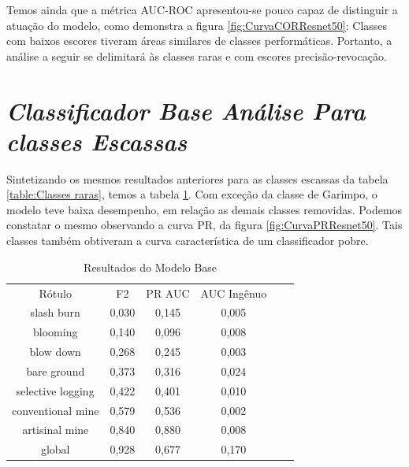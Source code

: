 Temos ainda que a métrica AUC-ROC apresentou-se pouco capaz de distinguir a atuação do modelo, como demonstra a figura \ref{fig:CurvaCORResnet50}: Classes com baixos escores tiveram áreas similares de classes performáticas. Portanto, a análise a seguir se delimitará às classes raras e com escores precisão-revocação.

\section{\textit{Classificador Base Análise Para classes Escassas}}\label{sec:Cap4_ClassifiadorBase}

Sintetizando os mesmos resultados anteriores para as classes escassas da tabela \ref{table:Classes raras}, temos a tabela \ref{table:ResultadosResnet50ClassesRaras}. Com exceção da classe de Garimpo, o modelo teve baixa desempenho, em relação as demais classes removidas. Podemos constatar o mesmo observando a curva PR, da figura \ref{fig:CurvaPRResnet50}. Tais classes também obtiveram a curva característica de um classificador pobre. 



\begin{table}[h!]
    \caption{Resultados do Modelo Base}
    \centering
\begin{tabular}{*{6}{c}}
    \toprule
    \midrule
                 Rótulo &  F2    & PR AUC &  AUC Ingênuo \\
             slash burn &  0,030 &  0,145 &       0,005 \\
               blooming &  0,140 &  0,096 &       0,008 \\
              blow down &  0,268 &  0,245 &       0,003 \\
            bare ground &  0,373 &  0,316 &       0,024 \\
      selective logging &  0,422 &  0,401 &       0,010 \\
      conventional mine &  0,579 &  0,536 &       0,002 \\
         artisinal mine &  0,840 &  0,880 &       0,008 \\
                 global &  0,928 &  0,677 &       0,170 \\         
    \bottomrule
\end{tabular}
\label{table:ResultadosResnet50ClassesRaras}
\end{table}
  

